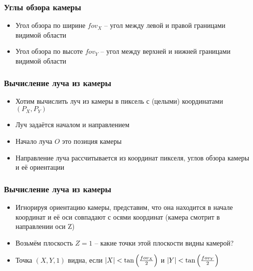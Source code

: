 \documentclass[10pt]{beamer}
\begin{document}
\begin{frame}
\frametitle{Углы обзора камеры}
\begin{itemize}
\item Угол обзора по ширине \begin{math}fov_X\end{math} -- угол между левой и правой границами видимой области
\pause
\item Угол обзора по высоте \begin{math}fov_Y\end{math} -- угол между верхней и нижней границами видимой области
\end{itemize}
\end{frame}

\begin{frame}
\frametitle{Вычисление луча из камеры}
\begin{itemize}
\item Хотим вычислить луч из камеры в пиксель с (целыми) координатами \begin{math}(P_X, P_Y)\end{math}
\pause
\item Луч задаётся началом и направлением
\pause
\item Начало луча \begin{math}O\end{math} это позиция камеры
\pause
\item Направление луча рассчитывается из координат пикселя, углов обзора камеры и её ориентации
\end{itemize}
\end{frame}

\begin{frame}
\frametitle{Вычисление луча из камеры}
\begin{itemize}
\item Игнорируя ориентацию камеры, представим, что она находится в начале координат и её оси совпадают с осями координат (камера смотрит в направлении оси Z)
\pause
\item Возьмём плоскость \begin{math}Z=1\end{math} -- какие точки этой плоскости видны камерой?
\pause
\item Точка \begin{math}(X, Y, 1)\end{math} видна, если \begin{math}|X| < \tan\left({fov_X\over 2}\right)\end{math} и \begin{math}|Y| < \tan\left({fov_Y\over 2}\right)\end{math}
\end{itemize}
\end{frame}
\end{document}
